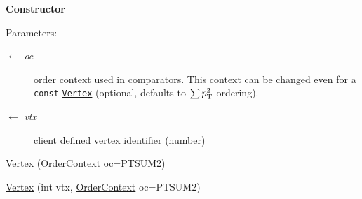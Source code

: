 \begin{Indent}{\bf Constructor}\par
{\em \begin{Desc}
\item[Parameters:]
\begin{description}
\item[\mbox{$\leftarrow$} {\em oc}]order context used in comparators. This context can be changed even for a {\tt const} {\tt \hyperlink{classVertex}{Vertex}} (optional, defaults to $\sum{p_{\rm T}^{2}}$ ordering).\item[\mbox{$\leftarrow$} {\em vtx}]client defined vertex identifier (number) \end{description}
\end{Desc}
}\begin{CompactItemize}
\item 
\hyperlink{classVertex_5faf15aab45361a72537f39050df6e52}{Vertex} (\hyperlink{classVertex_40a06cc3fde98913c8259e3c11cd37ec}{Order\-Context} oc=PTSUM2)
\item 
\hyperlink{classVertex_52ba84694e25fdbc3ee22d461ed7edbd}{Vertex} (int vtx, \hyperlink{classVertex_40a06cc3fde98913c8259e3c11cd37ec}{Order\-Context} oc=PTSUM2)
\end{CompactItemize}
\end{Indent}
